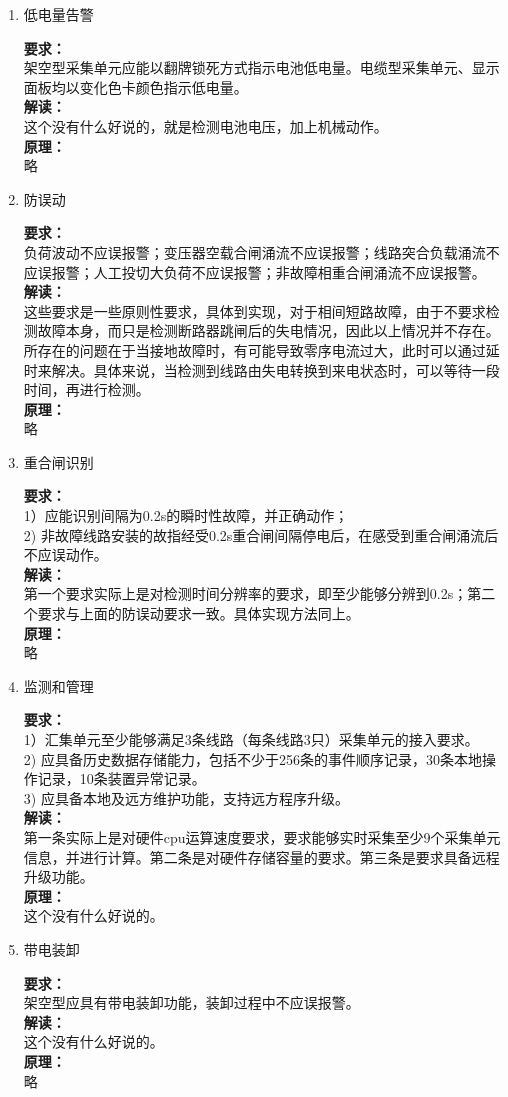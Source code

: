 \documentclass{article}
\begin{document}
\begin{CJK}{UTF8}{gbsn}
\begin{enumerate}
\item 低电量告警
	\par
	\textbf{要求：}\\
	架空型采集单元应能以翻牌锁死方式指示电池低电量。电缆型采集单元、显示面板均以变化色卡颜色指示低电量。\\
	\textbf{解读：}\\
	这个没有什么好说的，就是检测电池电压，加上机械动作。\\
	\textbf{原理：}\\
	略
\item 防误动
	\par
	\textbf{要求：}\\
	负荷波动不应误报警；变压器空载合闸涌流不应误报警；线路突合负载涌流不应误报警；人工投切大负荷不应误报警；非故障相重合闸涌流不应误报警。\\
	\textbf{解读：}\\
	这些要求是一些原则性要求，具体到实现，对于相间短路故障，由于不要求检测故障本身，而只是检测断路器跳闸后的失电情况，因此以上情况并不存在。所存在的问题在于当接地故障时，有可能导致零序电流过大，此时可以通过延时来解决。具体来说，当检测到线路由失电转换到来电状态时，可以等待一段时间，再进行检测。\\
	\textbf{原理：}\\
	略
\item 重合闸识别
	\par
	\textbf{要求：}\\
	1）应能识别间隔为0.2s的瞬时性故障，并正确动作；\\
	2) 非故障线路安装的故指经受0.2s重合闸间隔停电后，在感受到重合闸涌流后不应误动作。\\
	\textbf{解读：}\\
	第一个要求实际上是对检测时间分辨率的要求，即至少能够分辨到0.2s；第二个要求与上面的防误动要求一致。具体实现方法同上。\\
	\textbf{原理：}\\
	略
\item 监测和管理
	\par
	\textbf{要求：}\\
	1）汇集单元至少能够满足3条线路（每条线路3只）采集单元的接入要求。\\
	2) 应具备历史数据存储能力，包括不少于256条的事件顺序记录，30条本地操作记录，10条装置异常记录。\\
	3) 应具备本地及远方维护功能，支持远方程序升级。\\
	\textbf{解读：}\\
	第一条实际上是对硬件cpu运算速度要求，要求能够实时采集至少9个采集单元信息，并进行计算。第二条是对硬件存储容量的要求。第三条是要求具备远程升级功能。\\
	\textbf{原理：}\\
	这个没有什么好说的。
\item 带电装卸
	\par
	\textbf{要求：}\\
	架空型应具有带电装卸功能，装卸过程中不应误报警。\\
	\textbf{解读：}\\
	这个没有什么好说的。\\
	\textbf{原理：}\\
	略
	

\end{enumerate}
\end{CJK}
\end{document}
